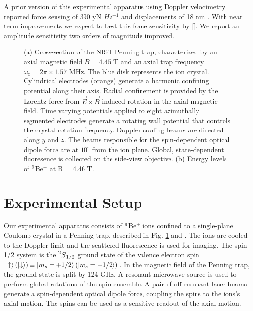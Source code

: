 \documentclass[aps,prl,twocolumn,superscriptaddress,floatfix]{revtex4-1}
\begin{document}
A prior version of this experimental apparatus using Doppler velocimetry reported force sensing of 390 yN $Hz^{-1}$ and displacements of 18 nm \citep{Biercuk2010a, Biercuk2011}. With near term improvements we expect to best this force sensitivity by []. We report an amplitude sensitivity two orders of magnitude improved.
\begin{figure}[h]
  \hfill
  \hfill
  \caption{(a) Cross-section of the NIST Penning trap, characterized by an axial magnetic field $B = 4.45$ T and an axial trap frequency $\omega_z = 2\pi \times 1.57$ MHz. The blue disk represents the ion crystal. Cylindrical electrodes (orange) generate a harmonic confining potential along their axis. Radial confinement is provided by the Lorentz force from $\vec{E} \times \vec{B}$-induced rotation in the axial magnetic field. Time varying potentials applied to eight azimuthally segmented electrodes generate a rotating wall potential that controls the crystal rotation frequency. Doppler cooling beams are directed along $y$ and $z$. The beams responsible for the spin-dependent optical dipole force are at $10^{\circ} $ from the ion plane. Global, state-dependent fluoresence is collected on the side-view objective. (b) Energy levels of $\prescript{9}{}{}$Be$^{+}$ at B = 4.46 T.}\label{Fig 1}
\end{figure}
\section{Experimental Setup}
Our experimental apparatus consists of $\prescript{9}{}{}$Be$^{+}$ ions confined to a single-plane Coulomb crystal in a Penning trap, described in Fig. \ref{Fig 1} and \citep{Bohnet2015a}. The ions are cooled to the Doppler limit and the scattered fluorescence is used for imaging. The spin-1/2 system is the $\prescript{2}{}{S}_{1/2}$ ground state of the valence electron spin $\ket{\uparrow} (\ket{\downarrow}) \equiv \ket{m_{s}=+1/2} (\ket{m_{s}=-1/2}) $. In the magnetic field of the Penning trap, the ground state is split by 124 GHz. A resonant microwave source is used to perform global rotations of the spin ensemble. A pair of off-resonant laser beams generate a spin-dependent optical dipole force, coupling the spins to the ions's axial motion. The spins can be used as a sensitive readout of the axial motion.
\end{document}
